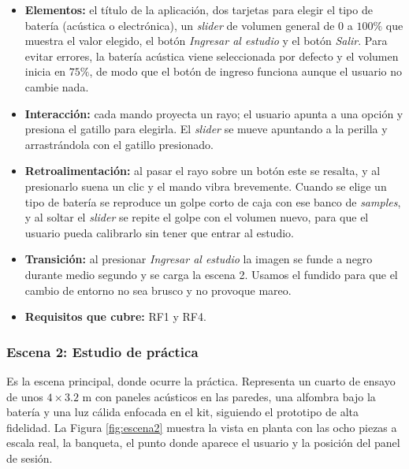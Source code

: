 \documentclass{article}
\begin{document}
\begin{itemize}
    \item \textbf{Elementos:} el título de la aplicación, dos tarjetas para elegir el tipo de batería (acústica o electrónica), un \textit{slider} de volumen general de $0$ a $100\%$ que muestra el valor elegido, el botón \textit{Ingresar al estudio} y el botón \textit{Salir}. Para evitar errores, la batería acústica viene seleccionada por defecto y el volumen inicia en $75\%$, de modo que el botón de ingreso funciona aunque el usuario no cambie nada.
    \item \textbf{Interacción:} cada mando proyecta un rayo; el usuario apunta a una opción y presiona el gatillo para elegirla. El \textit{slider} se mueve apuntando a la perilla y arrastrándola con el gatillo presionado.
    \item \textbf{Retroalimentación:} al pasar el rayo sobre un botón este se resalta, y al presionarlo suena un clic y el mando vibra brevemente. Cuando se elige un tipo de batería se reproduce un golpe corto de caja con ese banco de \textit{samples}, y al soltar el \textit{slider} se repite el golpe con el volumen nuevo, para que el usuario pueda calibrarlo sin tener que entrar al estudio.
    \item \textbf{Transición:} al presionar \textit{Ingresar al estudio} la imagen se funde a negro durante medio segundo y se carga la escena 2. Usamos el fundido para que el cambio de entorno no sea brusco y no provoque mareo.
    \item \textbf{Requisitos que cubre:} RF1 y RF4.
\end{itemize}

\subsubsection{Escena 2: Estudio de práctica}
Es la escena principal, donde ocurre la práctica. Representa un cuarto de ensayo de unos $4 \times 3.2$ m con paneles acústicos en las paredes, una alfombra bajo la batería y una luz cálida enfocada en el kit, siguiendo el prototipo de alta fidelidad. La Figura \ref{fig:escena2} muestra la vista en planta con las ocho piezas a escala real, la banqueta, el punto donde aparece el usuario y la posición del panel de sesión.
\end{document}
